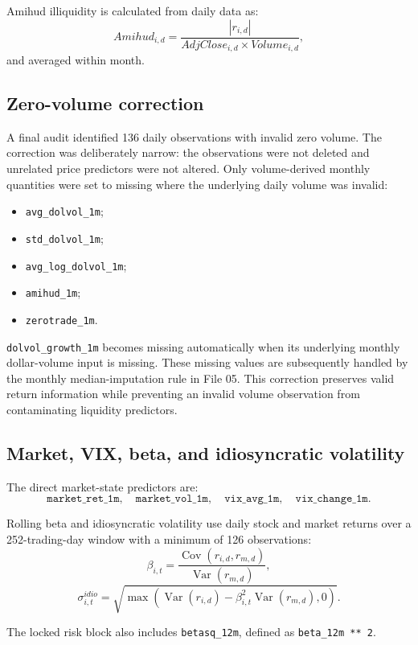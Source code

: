 \documentclass[11pt,a4paper]{article}
\newcommand{\code}[1]{\texttt{#1}}
\begin{document}
Amihud illiquidity is calculated from daily data as:
\[
  Amihud_{i,d}=\frac{|r_{i,d}|}{AdjClose_{i,d}\times Volume_{i,d}},
\]
and averaged within month.

\subsection{Zero-volume correction}

A final audit identified 136 daily observations with invalid zero volume. The correction was deliberately narrow: the observations were not deleted and unrelated price predictors were not altered. Only volume-derived monthly quantities were set to missing where the underlying daily volume was invalid:
\begin{itemize}
  \item \code{avg\_dolvol\_1m};
  \item \code{std\_dolvol\_1m};
  \item \code{avg\_log\_dolvol\_1m};
  \item \code{amihud\_1m};
  \item \code{zerotrade\_1m}.
\end{itemize}

\code{dolvol\_growth\_1m} becomes missing automatically when its underlying monthly dollar-volume input is missing. These missing values are subsequently handled by the monthly median-imputation rule in File 05. This correction preserves valid return information while preventing an invalid volume observation from contaminating liquidity predictors.

\subsection{Market, VIX, beta, and idiosyncratic volatility}

The direct market-state predictors are:
\[
\code{market\_ret\_1m},\quad
\code{market\_vol\_1m},\quad
\code{vix\_avg\_1m},\quad
\code{vix\_change\_1m}.
\]

Rolling beta and idiosyncratic volatility use daily stock and market returns over a 252-trading-day window with a minimum of 126 observations:
\[
  \beta_{i,t}=\frac{\operatorname{Cov}(r_{i,d},r_{m,d})}
  {\operatorname{Var}(r_{m,d})},
\]
\[
  \sigma^{idio}_{i,t}=
  \sqrt{\max\left(\operatorname{Var}(r_{i,d})-
  \beta_{i,t}^{2}\operatorname{Var}(r_{m,d}),0\right)}.
\]

The locked risk block also includes \code{betasq\_12m}, defined as \code{beta\_12m ** 2}.
\end{document}
